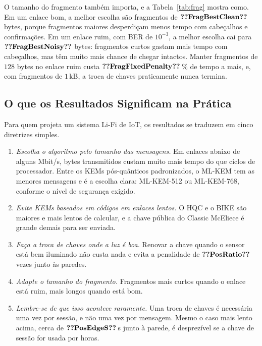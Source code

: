 \documentclass[12pt]{article}
\begin{document}
O tamanho do fragmento também importa, e a Tabela~\ref{tab:frag} mostra como.
Em um enlace bom, a melhor escolha são fragmentos de $\val{FragBestClean}$
bytes, porque fragmentos maiores desperdiçam menos tempo com cabeçalhos e
confirmações. Em um enlace ruim, com BER de $10^{-3}$, a melhor escolha cai
para $\val{FragBestNoisy}$ bytes: fragmentos curtos gastam mais tempo com
cabeçalhos, mas têm muito mais chance de chegar intactos. Manter fragmentos de
$128$ bytes no enlace ruim custa $\val{FragFixedPenalty}$\,\% de tempo a mais,
e, com fragmentos de $1$\,kB, a troca de chaves praticamente nunca termina.

\begin{table}[!htb]
\caption{Tempo da troca de chaves ML-KEM-512 (ms) a $400$\,kbit/s para
diferentes tamanhos de fragmento e taxas de erro, pela Eq.~\eqref{eq:ths}. O
melhor valor de cada coluna está em negrito.}
\label{tab:frag}
\centering
\small

\end{table}

\subsection{O que os Resultados Significam na Prática}\label{sec:practice}
Para quem projeta um sistema Li-Fi de IoT, os resultados se traduzem em cinco
diretrizes simples.
\begin{enumerate}
\item \emph{Escolha o algoritmo pelo tamanho das mensagens.} Em enlaces abaixo
      de alguns Mbit/s, bytes transmitidos custam muito mais tempo do que
      ciclos de processador. Entre os KEMs pós-quânticos padronizados, o ML-KEM
      tem as menores mensagens e é a escolha clara: ML-KEM-512 ou ML-KEM-768,
      conforme o nível de segurança exigido.
\item \emph{Evite KEMs baseados em códigos em enlaces lentos.} O HQC e o BIKE
      são maiores e mais lentos de calcular, e a chave pública do Classic
      McEliece é grande demais para ser enviada.
\item \emph{Faça a troca de chaves onde a luz é boa.} Renovar a chave quando o
      sensor está bem iluminado não custa nada e evita a penalidade de
      $\val{PosRatio}$ vezes junto às paredes.
\item \emph{Adapte o tamanho do fragmento.} Fragmentos mais curtos quando o
      enlace está ruim, mais longos quando está bom.
\item \emph{Lembre-se de que isso acontece raramente.} Uma troca de chaves é
      necessária uma vez por sessão, e não uma vez por mensagem. Mesmo o caso
      mais lento acima, cerca de $\val{PosEdgeS}$\,s junto à parede, é
      desprezível se a chave de sessão for usada por horas.
\end{enumerate}
\end{document}
